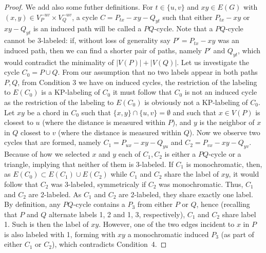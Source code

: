 \documentclass[12pt,a4paper,titlepage,openany]{report}
\begin{document}
\begin{proof}
We add also some futher definitions. For $t \in \{u, v\}$ and $xy \in E(G)$ with $(x, y) \in V_P^{-uv} \times V_Q^{-uv}$, a cycle $C = P_{tx}-xy-Q_{yt}$ such that either $P_{tx}-xy$ or $xy-Q_{yt}$ is an induced path will be called a $PQ$-cycle. Note that a
$P Q$-cycle cannot be 3-labeled: if, without loss of generality say $P' = P_{tx} -xy$ was an induced path, then we can find a shorter pair of paths, namely $P'$ and $Q_{yt}$, which would contradict the minimality of $|V(P)|+|V(Q)|$.\newline
Let us investigate the cycle $C_0=P\cup Q$. From our assumption that no two labels appear in both paths $P,Q$, from Condition 3 we have on induced cycles, the restriction of the labeling to $E(C_0)$ is a KP-labeling of $C_0$ it must follow that $C_0$ is not an induced cycle as the restriction of the labeling to $E(C_0)$ is obviously not a KP-labeling of $C_0$. Let $xy$ be a chord in $C_0$ such that $\{x, y\} \cap \{u, v\} = \emptyset$ and such that $x \in V (P )$ is closest to $u$ (where the distance is measured
within $P$), and $y$ is the neighbor of $x$ in $Q$ closest to $v$ (where the distance is measured within $Q$). Now we observe two cycles that are formed, namely $C_1 = P_{ux}-xy-Q_{yu}$ and $C_2 = P_{vx} -xy-Q_{yv}$. Because of how we selected $x$ and $y$ each of $C_1,C_2$ is either a $P Q$-cycle or a triangle, implying that neither of them is 3-labeled. If $C_1$ is monochromatic, then, as $E(C_0) \subset E(C_1 ) \cup E(C_2)$ while $C_1$ and $C_2$ share the label of $xy$, it would follow that $C_2$ was 3-labeled, symmetricaly if $C_2$ was monochromatic. Thus, $C_1$ and $C_2$ are 2-labeled. \newline
As $C_1$ and $C_2$ are 2-labeled, they share exactly one label. By definition, any $P Q$-cycle contains a $P_3$ from either $P$ or $Q$, hence (recalling that $P$ and $Q$ alternate labels 1, 2 and 1, 3, respectively), $C_1$ and $C_2$ share label 1. Such is then the label of $xy$. However, one of the two edges incident to $x$ in $P$ is also labeled with 1, forming with $xy$ a monochromatic
induced $P_3$ (as part of either $C_1$ or $C_2$), which contradicts Condition~4. 
\end{proof}
\end{document}
